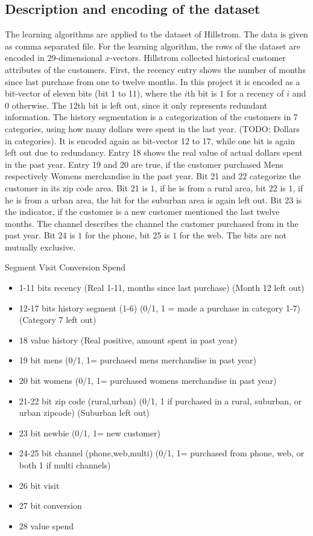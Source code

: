 \documentclass[10pt,twocolumn,letterpaper]{article}
\begin{document}
\subsection{Description and encoding of the dataset}
The learning algorithms are applied to the dataset of Hillstrom. The data is given as comma separated file.
For the learning algorithm, the rows of the dataset are encoded in 29-dimensional $x$-vectors.
Hillstrom collected historical customer attributes of the customers.
First, the recency entry shows the number of months since last purchase from one to twelve months. In this project it is encoded as a bit-vector of eleven bits (bit 1 to 11), where the $i$th bit is $1$ for a recency of $i$ and $0$ otherwise. The $12$th bit is left out, since it only represents redundant information.
The history segmentation is a categorization of the customers in 7 categories, using how many dollars were spent in the last year.
(TODO: Dollars in categories). It is encoded again as bit-vector 12 to 17, while one bit is again left out due to redundancy.
Entry 18 shows the real value of actual dollars spent in the past year. Entry 19 and 20 are true, if the customer purchased Mens respectively  Womens merchandise in the past year. Bit 21 and 22 categorize the customer in its zip code area. Bit 21 is $1$, if he is from a rural area, bit 22 is $1$, if he is from a urban area, the bit for the suburban area is again left out.
Bit 23 is the indicator, if the customer is a new customer mentioned the last twelve months.
The channel describes the channel the customer purchased  from  in the past year. Bit 24 is $1$ for the phone, bit 25 is $1$ for the web. The bits are not mutually exclusive. 

Segment
Visit
Conversion
Spend

\begin{itemize}
\item 1-11 bits recency (Real 1-11, months since last purchase)  (Month 12 left out)
\item 12-17 bits history segment (1-6) (0/1, 1 = made a purchase in category 1-7)   (Category 7 left out)
\item  18 value history (Real positive, amount spent in past year)
\item  19 bit mens (0/1, 1= purchased mens merchandise in past year)
\item  20 bit womens (0/1, 1= purchased womens merchandise in past year)
\item  21-22 bit zip code (rural,urban) (0/1, 1 if purchased in a rural, suburban, or urban zipcode)  (Suburban left out)
\item  23 bit newbie (0/1, 1= new customer)
\item  24-25 bit channel (phone,web,multi) (0/1, 1= purchased from phone, web, or both 1 if multi channels)
\item 26 bit visit
\item 27 bit conversion
\item 28 value spend
\end{itemize}
\end{document}
